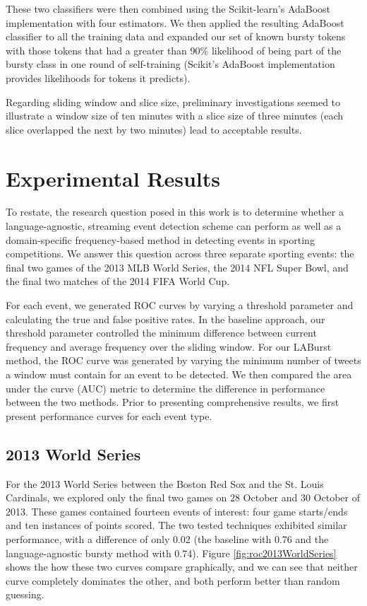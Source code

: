 \documentclass{acm_proc_article-sp}
\begin{document}
These two classifiers were then combined using the Scikit-learn's AdaBoost implementation with four estimators.
We then applied the resulting AdaBoost classifier to all the training data and expanded our set of known bursty tokens with those tokens that had a greater than 90\% likelihood of being part of the bursty class in one round of self-training (Scikit's AdaBoost implementation provides likelihoods for tokens it predicts).

Regarding sliding window and slice size, preliminary investigations seemed to illustrate a window size of ten minutes with a slice size of three minutes (each slice overlapped the next by two minutes) lead to acceptable results.

\section{Experimental Results}
\label{sect:results}

To restate, the research question posed in this work is to determine whether a language-agnostic, streaming event detection scheme can perform as well as a domain-specific frequency-based method in detecting events in sporting competitions.
We answer this question across three separate sporting events: the final two games of the 2013 MLB World Series, the 2014 NFL Super Bowl, and the final two matches of the 2014 FIFA World Cup.

For each event, we generated ROC curves by varying a threshold parameter and calculating the true and false positive rates.
In the baseline approach, our threshold parameter controlled the minimum difference between current frequency and average frequency over the sliding window.
For our LABurst method, the ROC curve was generated by varying the minimum number of tweets a window must contain for an event to be detected.
We then compared the area under the curve (AUC) metric to determine the difference in performance between the two methods.
Prior to presenting comprehensive results, we first present performance curves for each event type.

\subsection{2013 World Series}

For the 2013 World Series between the Boston Red Sox and the St. Louis Cardinals, we explored only the final two games on 28 October and 30 October of 2013.
These games contained fourteen events of interest: four game starts/ends and ten instances of points scored.
The two tested techniques exhibited similar performance, with a difference of only 0.02 (the baseline with 0.76 and the language-agnostic bursty method with 0.74).
Figure \ref{fig:roc2013WorldSeries} shows the how these two curves compare graphically, and we can see that neither curve completely dominates the other, and both perform better than random guessing.
\end{document}
